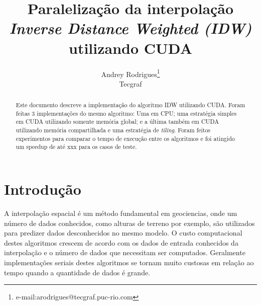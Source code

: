 \documentclass[conference]{acmsiggraph}
\title{Paralelização da interpolação \textit{Inverse Distance Weighted (IDW)} utilizando CUDA}
\author{Andrey Rodrigues\thanks{e-mail:arodrigues@tecgraf.puc-rio.com}\\Tecgraf}
\begin{document}

\maketitle

\begin{abstract}

Este documento descreve a implementação do algoritmo IDW utilizando CUDA. Foram feitas 3 implementações do mesmo algoritmo: Uma em CPU; uma estratégia simples em CUDA utilizando somente memória global; e a última também em CUDA utilizando memória compartilhada e uma estratégia de \textit{tiling}. Foram feitos experimentos para comparar o tempo de execução entre os algoritmos e foi atingido um speedup de até xxx para os casos de teste.

\end{abstract}

\keywordlist




\copyrightspace

\section{Introdução}
A interpolação espacial é um método fundamental em geociencias, onde um número de dados conhecidos, como alturas de terreno por exemplo, são utilizados para predizer dados desconhecidos no mesmo modelo. O custo computacional destes algoritmos crescem de acordo com os dados de entrada conhecidos da interpolação e o número de dados que necessitam ser computados. Geralmente implementações seriais destes algoritmos se tornam muito custosas em relação ao tempo quando a quantidade de dados é grande.
\end{document}
